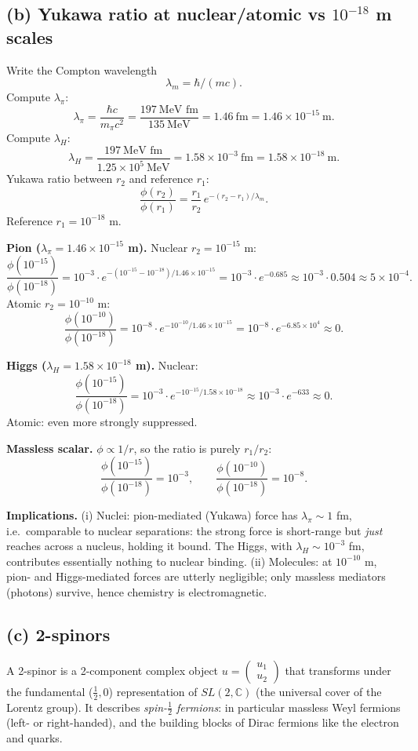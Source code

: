 \documentclass[11pt]{article}
\begin{document}
\subsection*{(b) Yukawa ratio at nuclear/atomic vs $10^{-18}$ m scales}

Write the Compton wavelength
\[ \lambda_m = \hbar/(mc). \]
Compute $\lambda_\pi$:
\[ \lambda_\pi = \frac{\hbar c}{m_\pi c^2} = \frac{197\ \text{MeV fm}}{135\ \text{MeV}} = 1.46\ \text{fm} = 1.46\times 10^{-15}\ \text{m}. \]
Compute $\lambda_H$:
\[ \lambda_H = \frac{197\ \text{MeV fm}}{1.25\times 10^{5}\ \text{MeV}} = 1.58\times 10^{-3}\ \text{fm} = 1.58\times 10^{-18}\ \text{m}. \]
Yukawa ratio between $r_2$ and reference $r_1$:
\[ \frac{\phi(r_2)}{\phi(r_1)} = \frac{r_1}{r_2}\,e^{-(r_2-r_1)/\lambda_m}. \]
Reference $r_1=10^{-18}$ m.

\medskip
\textbf{Pion ($\lambda_\pi=1.46\times 10^{-15}$ m).} Nuclear $r_2=10^{-15}$ m:
\[ \frac{\phi(10^{-15})}{\phi(10^{-18})} = 10^{-3}\cdot e^{-(10^{-15}-10^{-18})/1.46\times 10^{-15}} = 10^{-3}\cdot e^{-0.685}\approx 10^{-3}\cdot 0.504\approx 5\times 10^{-4}. \]
Atomic $r_2=10^{-10}$ m:
\[ \frac{\phi(10^{-10})}{\phi(10^{-18})} = 10^{-8}\cdot e^{-10^{-10}/1.46\times 10^{-15}} = 10^{-8}\cdot e^{-6.85\times 10^{4}}\approx 0. \]

\textbf{Higgs ($\lambda_H=1.58\times 10^{-18}$ m).} Nuclear:
\[ \frac{\phi(10^{-15})}{\phi(10^{-18})} = 10^{-3}\cdot e^{-10^{-15}/1.58\times 10^{-18}}\approx 10^{-3}\cdot e^{-633}\approx 0. \]
Atomic: even more strongly suppressed.

\textbf{Massless scalar.} $\phi\propto 1/r$, so the ratio is purely $r_1/r_2$:
\[ \frac{\phi(10^{-15})}{\phi(10^{-18})} = 10^{-3},\qquad \frac{\phi(10^{-10})}{\phi(10^{-18})} = 10^{-8}. \]

\textbf{Implications.}
(i) Nuclei: pion-mediated (Yukawa) force has $\lambda_\pi\sim 1$ fm, i.e.\ comparable to nuclear separations: the strong force is short-range but \emph{just} reaches across a nucleus, holding it bound. The Higgs, with $\lambda_H\sim 10^{-3}$ fm, contributes essentially nothing to nuclear binding.
(ii) Molecules: at $10^{-10}$ m, pion- and Higgs-mediated forces are utterly negligible; only massless mediators (photons) survive, hence chemistry is electromagnetic.

\subsection*{(c) 2-spinors}

A 2-spinor is a 2-component complex object $u=\begin{pmatrix}u_1\\u_2\end{pmatrix}$ that transforms under the fundamental ($\tfrac12,0$) representation of $SL(2,\mathbb{C})$ (the universal cover of the Lorentz group). It describes \emph{spin-$\tfrac12$ fermions}: in particular massless Weyl fermions (left- or right-handed), and the building blocks of Dirac fermions like the electron and quarks.
\end{document}
